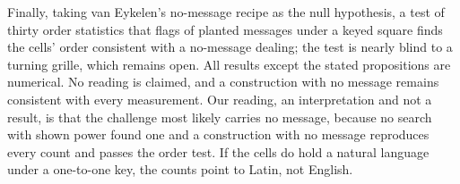 Finally, taking van Eykelen's no-message recipe as the null hypothesis, a test of thirty order statistics that flags \nmSquare{} of \nmPlanted{} planted messages under a keyed square finds the cells' order consistent with a no-message dealing; the test is nearly blind to a turning grille, which remains open. All results except the stated propositions are numerical. No reading is claimed, and a construction with no message remains consistent with every measurement. Our reading, an interpretation and not a result, is that the challenge most likely carries no message, because no search with shown power found one and a construction with no message reproduces every count and passes the order test. If the cells do hold a natural language under a one-to-one key, the counts point to Latin, not English.
